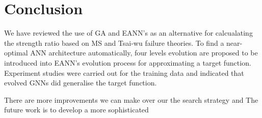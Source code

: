 \section{Conclusion}
We have reviewed the use of GA and EANN's as an alternative for calcualating
the strength ratio based on MS and Tsai-wu failure theories. To find a
near-optimal ANN architecture automatically, four levels evolution are proposed
to be introduced into EANN's evolution process for approximating a target
function. Experiment studies were carried out for the training data and
indicated that evolved GNNs did generalise the target function.

There are more improvements we can make over our the search strategy and 
The future work is to develop a more sophisticated 
